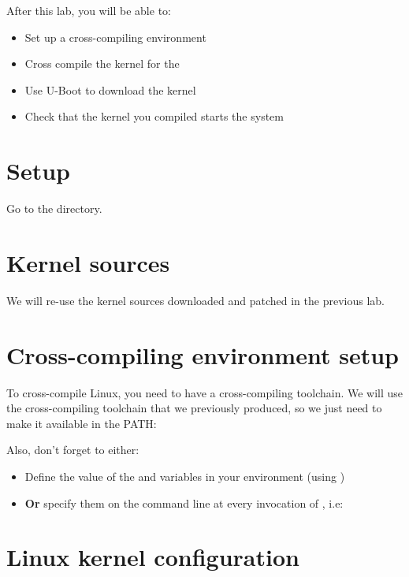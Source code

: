 
After this lab, you will be able to:
\begin{itemize}
\item Set up a cross-compiling environment
\item Cross compile the kernel for the \labboarddescription
\item Use U-Boot to download the kernel
\item Check that the kernel you compiled starts the system
\end{itemize}

\section{Setup}

Go to the  directory.

\section{Kernel sources}

We will re-use the kernel sources downloaded and patched in the
previous lab.

\section{Cross-compiling environment setup}

To cross-compile Linux, you need to have a cross-compiling
toolchain. We will use the cross-compiling toolchain that we
previously produced, so we just need to make it available in the PATH:


Also, don't forget to either:

\begin{itemize}
\item Define the value of the  and 
  variables in your environment (using )
\item {\bf Or} specify them on the command line at every invocation of
  , i.e: 
\end{itemize}

\section{Linux kernel configuration}

